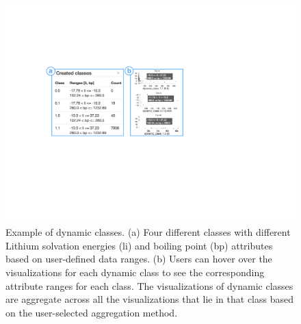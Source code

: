   \begin{figure}[h!]
    \captionsetup{font=normalsize,labelfont=normalsize}
   \centering
   \includegraphics[width=0.4\linewidth]{figures/dcc.pdf}
   \caption{Example of dynamic classes. (a) Four different classes with different Lithium solvation energies (li) and boiling point (bp) attributes based on user-defined data ranges. (b) Users can hover over the visualizations for each dynamic class to see the corresponding attribute ranges for each class. The visualizations of dynamic classes are aggregate across all the visualizations that lie in that class based on the user-selected aggregation method.}
   \label{dcc}
 \end{figure}
 \clearpage
